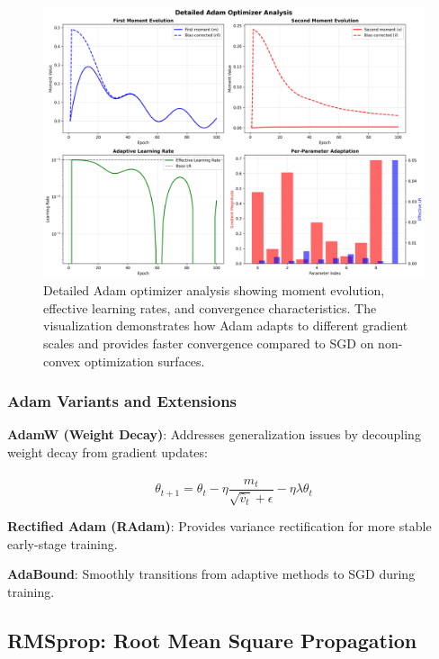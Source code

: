 \documentclass[11pt,a4paper]{report}
\begin{document}
\begin{figure}[H]
\centering
\includegraphics[width=\textwidth]{optimizer_adam_detailed_analysis.png}
\caption{Detailed Adam optimizer analysis showing moment evolution, effective learning rates, and convergence characteristics. The visualization demonstrates how Adam adapts to different gradient scales and provides faster convergence compared to SGD on non-convex optimization surfaces.}
\label{fig:adam_analysis}
\end{figure}

\subsubsection{Adam Variants and Extensions}

\textbf{AdamW (Weight Decay)}: Addresses generalization issues by decoupling weight decay from gradient updates:

\begin{equation}
\theta_{t+1} = \theta_t - \eta \frac{\hat{m}_t}{\sqrt{\hat{v}_t} + \epsilon} - \eta \lambda \theta_t
\end{equation}

\textbf{Rectified Adam (RAdam)}: Provides variance rectification for more stable early-stage training.

\textbf{AdaBound}: Smoothly transitions from adaptive methods to SGD during training.

\subsection{RMSprop: Root Mean Square Propagation}
\end{document}
